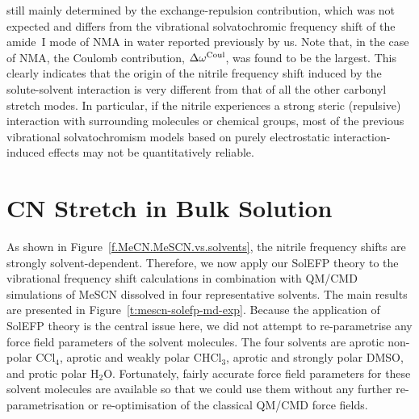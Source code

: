 \documentclass[a4paper,titlepage,twoside,fleqn,12pt]{book}
\begin{document}
\begin{refsection}
still mainly determined by the exchange\hyp{}repulsion
contribution, which was not expected and differs from the
vibrational solvatochromic frequency shift of the amide~I mode
of NMA in water reported previously by us. \citep{Blasiak.Cho.JCP.2014,Blasiak.Cho.JCP.2015} 
Note that, in
the case of NMA, the Coulomb contribution, $\Delta\omega^{\rm Coul}$, was found
to be the largest. This clearly indicates that the origin of the
nitrile frequency shift induced by the solute\hyp{}solvent
interaction is very different from that of all the other carbonyl
stretch modes. In particular, if the nitrile experiences a strong
steric (repulsive) interaction with surrounding molecules or
chemical groups, most of the previous vibrational
solvatochromism models based on purely electrostatic
interaction\hyp{}induced effects may not be quantitatively reliable.



\section{CN Stretch in Bulk Solution\label{s:dw-cn-bulk}}

As shown in Figure~\ref{f.MeCN.MeSCN.vs.solvents}, 
the nitrile frequency shifts are strongly
solvent\hyp{}dependent. Therefore, we now apply our SolEFP
theory to the vibrational frequency shift calculations in
combination with QM/CMD simulations of MeSCN dissolved in four
representative solvents. The main results are presented in
Figure~\ref{t:mescn-solefp-md-exp}. Because the application of SolEFP 
theory is the central
issue here, we did not attempt to re\hyp{}parametrise any force
field parameters of the solvent molecules. The four solvents
are aprotic non\hyp{}polar CCl$_4$, aprotic and weakly polar CHCl$_3$,
aprotic and strongly polar DMSO, and protic polar H$_2$O.
Fortunately, fairly accurate force field parameters for these
solvent molecules are available so that we could use them
without any further re\hyp{}parametrisation or re\hyp{}optimisation of
the classical QM/CMD force fields.


\end{refsection}
\end{document}
